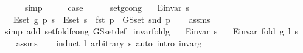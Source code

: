 \begin{isabellebody}
\ \ \ \ \isamarkupfalse%
\ simp\isanewline
\ \ \isamarkupfalse%
\ \isamarkupfalse%
\ {\isacharquery}{\kern0pt}case\isanewline
\ \ \ \ \isacommand{{\isachardot}{\kern0pt}}\isamarkupfalse%
\isanewline
{}\isamarkupfalse%
%
\endisatagproof
{\isafoldproof}%
%
\isadelimproof
\isanewline
%
\endisadelimproof
\isanewline
{}\isamarkupfalse%
\ set{\isacharunderscore}{\kern0pt}g{\isacharunderscore}{\kern0pt}cong{\isacharcolon}{\kern0pt}\isanewline
\ \ \ {\isachardoublequoteopen}E{\isachardot}{\kern0pt}invar\ s{\isachardoublequoteclose}\isanewline
\ \ \ {\isachardoublequoteopen}E{\isachardot}{\kern0pt}set\ {\isacharparenleft}{\kern0pt}g\ p\ s{\isacharparenright}{\kern0pt}\ {\isacharequal}{\kern0pt}\ E{\isachardot}{\kern0pt}set\ s\ {\isasymunion}\ {\isacharbraceleft}{\kern0pt}fst\ p{\isacharbraceright}{\kern0pt}\ {\isasymtimes}\ G{\isachardot}{\kern0pt}S{\isachardot}{\kern0pt}set\ {\isacharparenleft}{\kern0pt}snd\ p{\isacharparenright}{\kern0pt}{\isachardoublequoteclose}\isanewline
%
\isadelimproof
\ \ %
\endisadelimproof
%
\isatagproof
{}\isamarkupfalse%
\ assms\isanewline
\ \ \isamarkupfalse%
\ {\isacharparenleft}{\kern0pt}simp\ add{\isacharcolon}{\kern0pt}\ set{\isacharunderscore}{\kern0pt}fold{\isacharunderscore}{\kern0pt}f{\isacharunderscore}{\kern0pt}cong\ G{\isachardot}{\kern0pt}S{\isachardot}{\kern0pt}set{\isacharunderscore}{\kern0pt}def{\isacharparenright}{\kern0pt}%
\endisatagproof
{\isafoldproof}%
%
\isadelimproof
\isanewline
%
\endisadelimproof
\isanewline
{}\isamarkupfalse%
\ invar{\isacharunderscore}{\kern0pt}fold{\isacharunderscore}{\kern0pt}g{\isacharcolon}{\kern0pt}\isanewline
\ \ \ {\isachardoublequoteopen}E{\isachardot}{\kern0pt}invar\ s{\isachardoublequoteclose}\isanewline
\ \ \ {\isachardoublequoteopen}E{\isachardot}{\kern0pt}invar\ {\isacharparenleft}{\kern0pt}fold\ g\ l\ s{\isacharparenright}{\kern0pt}{\isachardoublequoteclose}\isanewline
%
\isadelimproof
\ \ %
\endisadelimproof
%
\isatagproof
{}\isamarkupfalse%
\ assms\isanewline
\ \ \isamarkupfalse%
\ {\isacharparenleft}{\kern0pt}induct\ l\ arbitrary{\isacharcolon}{\kern0pt}\ s{\isacharparenright}{\kern0pt}\ {\isacharparenleft}{\kern0pt}auto\ intro{\isacharcolon}{\kern0pt}\ invar{\isacharunderscore}{\kern0pt}g{\isacharparenright}{\kern0pt}%
\endisatagproof
{\isafoldproof}%
%
\isadelimproof
\isanewline
%
\endisadelimproof
\isanewline
{}\isamarkupfalse%

\end{isabellebody}
